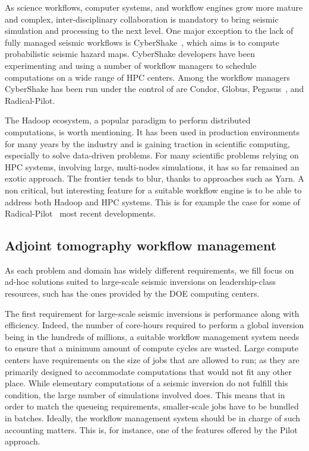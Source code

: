 As science workflows, computer systems, and workflow engines grow more mature and
complex, inter-disciplinary collaboration is mandatory to bring seismic
simulation and processing to the next level.
One major exception to the lack of fully managed seismic workflows is
CyberShake~\cite{Graves2011}, which aims is to compute probabilistic seismic
hazard maps. CyberShake developers have been experimenting and using a number
of workflow managers to schedule computations on a wide range of HPC centers.
Among the workflow managers CyberShake has been run under the control of are
Condor, Globus, Pegasus~\cite{Callaghan2010}, and Radical-Pilot.

The Hadoop ecosystem, a popular paradigm to perform distributed computations, is
worth mentioning. It has been used in production environments for many years by
the industry and is gaining traction in scientific computing, especially to
solve data-driven problems. For many scientific problems relying on HPC systems,
involving large, multi-nodes simulations, it has so far remained an exotic
approach. The frontier tends to blur, thanks to approaches such as Yarn. A non
critical, but interesting feature for a suitable workflow engine is to be
able to address both Hadoop and HPC systems. This is for example the case for
some of Radical-Pilot~\cite{Luckow2015} most recent developments.

\subsection{Adjoint tomography workflow management}

As each problem and domain has widely different requirements, we fill focus
on ad-hoc solutions suited to large-scale seismic inversions on leadership-class
resources, such has the ones provided by the DOE computing centers.

The first requirement for large-scale seismic inversions is performance along
with efficiency. Indeed, the number of core-hours required to perform a global
inversion being in the hundreds of millions, a suitable workflow
management system needs to ensure that a minimum amount of compute cycles are
wasted. Large compute centers have requirements on the size of jobs that are
allowed to run; as they are primarily designed to accommodate computations that
would not fit any other place. While elementary computations of a seismic
inversion do not fulfill this condition, the large number of simulations involved
does. This means that in order to match the queueing requirements, smaller-scale
jobs have to be bundled in batches. Ideally, the workflow management
system should be in charge of such accounting matters. This is, for instance,
one of the features offered by the Pilot approach.

